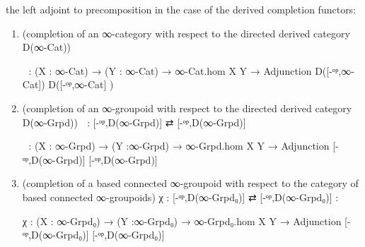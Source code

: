 \documentclass{book}
\theoremstyle{definition}
\begin{document}
\begin{center}
\end{center}


\iffalse

 the left adjoint to precomposition in the case of the derived completion functors:

\begin{enumerate}
\item (completion of an ∞-category with respect to the directed derived category D(∞-Cat))
\begin{center}
 χ⃗  : (X : ∞-Cat) → (Y : ∞-Cat) → ∞-Cat.hom X Y → Adjunction D([-ᵒᵖ,∞-Cat]) D([-ᵒᵖ,∞-Cat] )
\end{center}
\item (completion of an ∞-groupoid with respect to the directed derived category D(∞-Grpd)) χ⃡ : [-ᵒᵖ,D(∞-Grpd)] ⇄ [-ᵒᵖ,D(∞-Grpd)]
\begin{center}
 χ⃡ : (X : ∞-Grpd) → (Y :∞-Grpd) → ∞-Grpd.hom X Y → Adjunction [-ᵒᵖ,D(∞-Grpd)] [-ᵒᵖ,D(∞-Grpd)]
\end{center}
\item (completion of a based connected ∞-groupoid with respect to the category of based connected ∞-groupoids) χ : [-ᵒᵖ,D(∞-Grpd₀)] ⇄ [-ᵒᵖ,D(∞-Grpd₀)] :
\begin{center}
 χ : (X : ∞-Grpd₀) → (Y :∞-Grpd₀) → ∞-Grpd₀.hom X Y → Adjunction [-ᵒᵖ,D(∞-Grpd₀)] [-ᵒᵖ,D(∞-Grpd₀)]
\end{center}
\end{enumerate}
\end{document}
